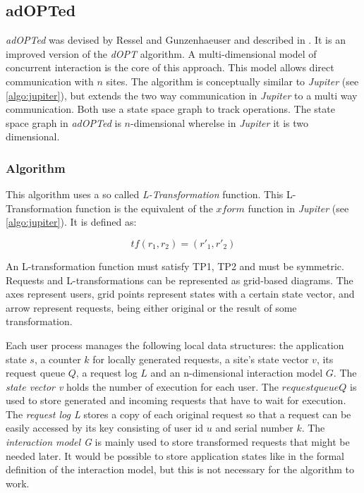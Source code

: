 \subsection{adOPTed}
\label{algo:adopted}

\emph{adOPTed} was devised by Ressel and Gunzenhaeuser and described in \cite{ressel96}. It is an improved version of the \emph{dOPT} algorithm. A multi-dimensional model of concurrent interaction is the core of this approach. This model allows direct communication with $n$ sites. The algorithm is conceptually similar to \emph{Jupiter} (see \ref{algo:jupiter}), but extends the two way communication in \emph{Jupiter} to a multi way communication. Both use a state space graph to track operations. The state space graph in \emph{adOPTed} is $n$-dimensional wherelse in \emph{Jupiter} it is two dimensional.


\subsubsection{Algorithm}
This algorithm uses a so called \emph{L-Transformation} function. This L-Transformation function is the equivalent of the $xform$ function in \emph{Jupiter} (see \ref{algo:jupiter}). It is defined as:

\label{algo:adopted:tf}
$$ tf(r_1,r_2) = (r'_1,r'_2) $$

An L-transformation function must satisfy TP1, TP2 and must be symmetric. Requests and L-transformations can be represented as grid-based diagrams. The axes represent users, grid points represent states with a certain state vector, and arrow represent requests, being either original or the result of some transformation.

Each user process manages the following local data structures: the application state $s$, a counter $k$ for locally generated requests, a site's state vector $v$, its request queue $Q$, a request log $L$ and an n-dimensional interaction model $G$. The \emph{state vector v} holds the number of execution for each user. The $request queue Q$ is used to store generated and incoming requests that have to wait for execution. The \emph{request log L} stores a copy of each original request so that a request can be easily accessed by its key consisting of user id $u$ and serial number $k$. The \emph{interaction model G} is mainly used to store transformed requests that might be needed later. It would be possible to store application states like in the formal definition of the interaction model, but this is not necessary for the algorithm to work.


